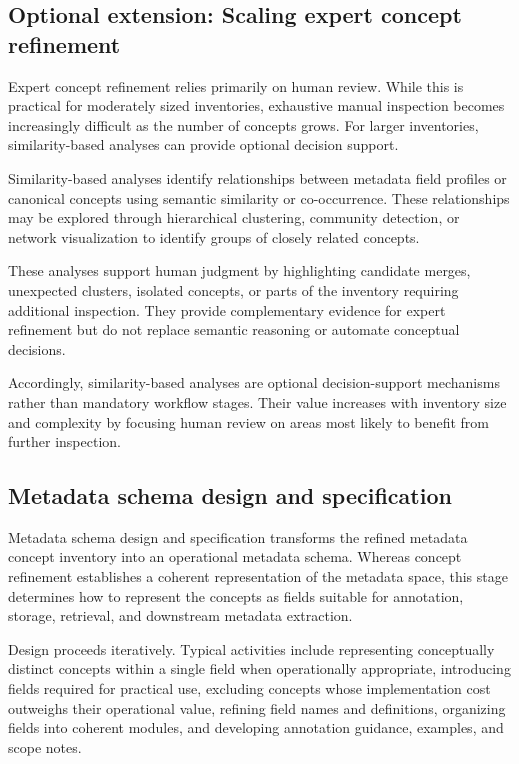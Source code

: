 \documentclass{article}
\begin{document}
\subsection{Optional extension: Scaling expert concept refinement}

Expert concept refinement relies primarily on human review. While this is practical for moderately sized inventories, exhaustive manual inspection becomes increasingly difficult as the number of concepts grows. For larger inventories, similarity-based analyses can provide optional decision support.

Similarity-based analyses identify relationships between metadata field profiles or canonical concepts using semantic similarity or co-occurrence. These relationships may be explored through hierarchical clustering, community detection, or network visualization to identify groups of closely related concepts.

These analyses support human judgment by highlighting candidate merges, unexpected clusters, isolated concepts, or parts of the inventory requiring additional inspection. They provide complementary evidence for expert refinement but do not replace semantic reasoning or automate conceptual decisions.

Accordingly, similarity-based analyses are optional decision-support mechanisms rather than mandatory workflow stages. Their value increases with inventory size and complexity by focusing human review on areas most likely to benefit from further inspection.

\subsection{Metadata schema design and specification}

Metadata schema design and specification transforms the refined metadata concept inventory into an operational metadata schema. Whereas concept refinement establishes a coherent representation of the metadata space, this stage determines how to represent the concepts as fields suitable for annotation, storage, retrieval, and downstream metadata extraction.

Design proceeds iteratively. Typical activities include representing conceptually distinct concepts within a single field when operationally appropriate, introducing fields required for practical use, excluding concepts whose implementation cost outweighs their operational value, refining field names and definitions, organizing fields into coherent modules, and developing annotation guidance, examples, and scope notes.
\end{document}
